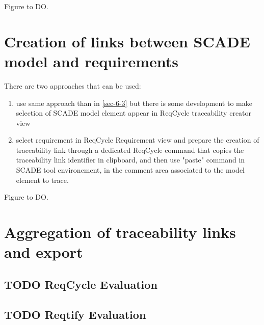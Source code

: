 \documentclass[11pt]{template/openetcs_report}
\begin{document}
Figure to DO.

\section{Creation of links between SCADE model and requirements}
\label{sec-6-4}
There are two approaches that can be used: 
\begin{enumerate}
\item use same approach than in \ref{sec-6-3} but there is some development to make selection of SCADE model element appear in ReqCycle traceability creator view
\item select requirement in ReqCycle Requirement view and prepare the creation of traceability link through a dedicated ReqCycle command that copies the traceability link identifier in clipboard, and then use "paste" command in SCADE tool environement, in the comment area associated to the model element to trace.
\end{enumerate} 

Figure to DO.

\section{Aggregation of traceability links and export}
\label{sec-6-5}

\subsection{{\bfseries\sffamily TODO} ReqCycle  Evaluation}
\label{sec-4-5}
\subsection{{\bfseries\sffamily TODO} Reqtify Evaluation}
\label{sec-4-6}






\end{document}
